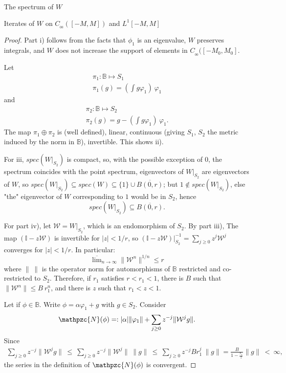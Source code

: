 \documentclass[12pt]{article}
\begin{document}
\begin{section}{The spectrum of $W$ }
\begin{subsection}{Iterates of $W$ on $C_{_{0\!0}}([-M,M])$ and $L^1[-M,M]$ }
\begin{proof} Part i) follows from the facts that $\phi_1$ is an eigenvalue, $W$ preserves integrals, and $W$ does not increase the support of elements in $C_{_{00}}([-M_0,M_0]$.  
	
Let
\begin{align*}
\pi_1:\mathbb{B} \longmapsto S_1 \\
\pi_1(g) = (\int g \varphi_1) \ \varphi_1
\end{align*}
and
\begin{align*}
\pi_2:\mathbb{B} \longmapsto S_2 \\
\pi_2(g) = g - (\int g \varphi_1) \ \varphi_1.
\end{align*}
The map $\pi_1 \oplus \pi_2$ is (well defined), linear, continuous (giving $S_1$, $S_2$ the metric induced by the norm in $\mathbb{B}$), invertible. This shows ii).  

For iii, $spec(W\Big|_{S_2})$ is compact, so, with the possible exception of $0$, the spectrum coincides with the point spectrum, eigenvectors of $W\Big|_{S_2}$ are eigenvectors of $W$, so $spec(W\Big|_{S_2}) \subseteq spec(W) \subseteq \{1\} \cup \overline{B(0,r)}$; but $1 \notin spec(W\Big|_{S_2})$, else "the" eigenvector of $W$ corresponding to $1$ would be in $S_2$, hence 
$$
spec(W\Big|_{S_2}) \subseteq \overline{B(0,r)}.
$$

For part iv), let $\mathcal{W} = W|_{S_2}$, which is an endomorphism of $S_2$. By part iii), The map $(\mathbb{I} - z \mathcal{W})$ is invertible for $|z| < 1/r$,  so $(\mathbb{I} - z \mathcal{W})|_{S_2}^{-1} = \sum_{j \ge 0} z^j \mathcal{W}^j$ converges for $|z| < 1/r$. In particular:
$$
\overline{\lim}_{n \rightarrow \infty} \| \mathcal{W}^n\|^{1/n} \le r
$$ 
where $\| \ \|$ is the operator norm for automorphisms of $\mathbb{B}$ restricted and co-restricted to $S_2$. Therefore, if $r_1$ satisfies $r < r_1 < 1$, there is $B$ such that $\| \mathcal{W}^n \| \le B \ r_1^n$, and there is $z$ such that $ r_1 < z < 1$.  

Let if $\phi \in \mathbb{B}$. Write $\phi = \alpha \varphi_1 + g$ with $g \in S_2$. Consider 
$$
\mathpzc{N}(\phi) =: |\alpha| \| \varphi_1 \| + \sum_{j \ge 0} z^{-j} \| \mathcal{W}^j g\|. 
$$
Since 
\begin{align*}
\sum_{j \ge 0} z^{-j} \| \mathcal{W}^j g\| 
~\le~ \sum_{j \ge 0} z^{-j} \| \mathcal{W}^j \| \ \|g\|  
~\le~ \sum_{j \ge 0} z^{-j} B r_1^j \ \|g\| = \frac{B}{1 - \frac{r_1}{z} } \|g\|
~<~ \infty,
\end{align*}
the series in the definition of $\mathpzc{N}(\phi)$ is convergent.


\end{proof}
\end{subsection}
\end{section}
\end{document}
